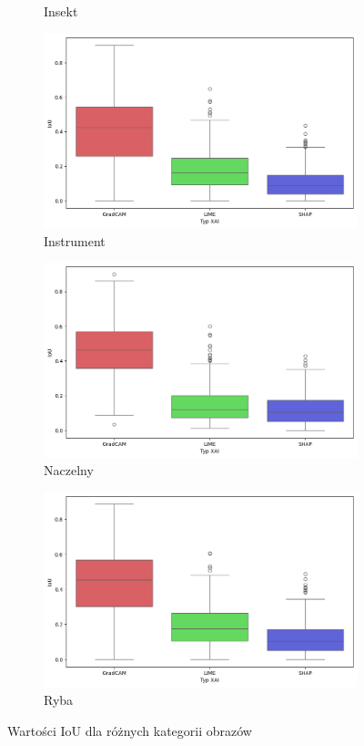\begin{figure}[h]
\begin{subfigure}[b]{0.3\textwidth}
		\caption{Insekt}
	\end{subfigure}
	\begin{subfigure}[b]{0.3\textwidth}
		\centering\includegraphics[width=.9\textwidth]{img/base_iou_music}
		\caption{Instrument}
	\end{subfigure}
	\begin{subfigure}[b]{0.3\textwidth}
		\centering\includegraphics[width=.9\textwidth]{img/base_iou_primate}
		\caption{Naczelny}
	\end{subfigure}
	\begin{subfigure}[b]{0.3\textwidth}
		\centering\includegraphics[width=.9\textwidth]{img/base_iou_fish}
		\caption{Ryba}
	\end{subfigure}
	\caption{Wartości IoU dla różnych kategorii obrazów}
	\label{rys:base_iou_category}
\end{figure}

